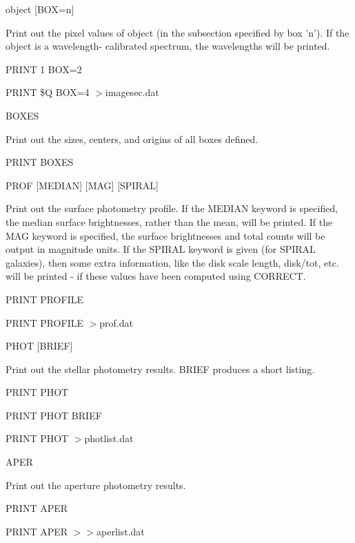 \begin{example}
  \item[object {[BOX=n]}\hfill]{ Print out the pixel values of object (in
       the subsection specified by box 'n').  If the object is a
       wavelength- calibrated spectrum, the wavelengths will be printed.
  \begin{hanging}
    \item{PRINT 1 BOX=2}
    \item{PRINT \$Q BOX=4 $>$imagesec.dat}
  \end{hanging}
}

  \item[BOXES\hfill]{Print out the sizes, centers, and origins of all boxes
       defined.
  \begin{hanging}
    \item{PRINT BOXES}
  \end{hanging}
}

  \item[PROF {[MEDIAN]} {[MAG]} {[SPIRAL]}\hfill]{ Print out the surface
       photometry profile.  If the MEDIAN keyword is specified, the median
       surface brightnesses, rather than the mean, will be printed. If the
       MAG keyword is specified, the surface brightnesses and total counts
       will be output in magnitude units. If the SPIRAL keyword is given
       (for SPIRAL galaxies), then some extra information, like the disk
       scale length, disk/tot, etc. will be printed - if these values have
       been computed using CORRECT.
  \begin{hanging}
    \item{PRINT PROFILE}
    \item{PRINT PROFILE $>$prof.dat}
  \end{hanging}
}

  \item[PHOT {[BRIEF]}\hfill]{ Print out the stellar photometry results.
       BRIEF produces a short listing.
  \begin{hanging}
    \item{PRINT PHOT }
    \item{PRINT PHOT BRIEF}
    \item{PRINT PHOT $>$photlist.dat}
  \end{hanging}
}

  \item[APER\hfill]{ Print out the aperture photometry results.
  \begin{hanging}
    \item{PRINT APER}
    \item{PRINT APER $>>$aperlist.dat}
  \end{hanging}
}


\end{example}
